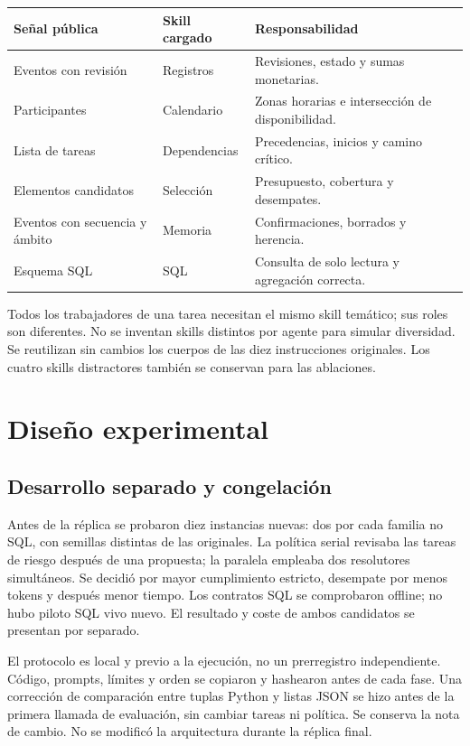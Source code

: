 \documentclass[11pt,a4paper]{article}
\begin{document}
\begin{center}\small
\begin{tabularx}{\linewidth}{@{}p{32mm}p{28mm}X@{}}
\toprule Señal pública & Skill cargado & Responsabilidad \\ \midrule
Eventos con revisión & Registros & Revisiones, estado y sumas monetarias. \\
Participantes & Calendario & Zonas horarias e intersección de disponibilidad. \\
Lista de tareas & Dependencias & Precedencias, inicios y camino crítico. \\
Elementos candidatos & Selección & Presupuesto, cobertura y desempates. \\
Eventos con secuencia y ámbito & Memoria & Confirmaciones, borrados y herencia. \\
Esquema SQL & SQL & Consulta de solo lectura y agregación correcta. \\
\bottomrule
\end{tabularx}\end{center}

Todos los trabajadores de una tarea necesitan el mismo skill temático; sus roles
son diferentes. No se inventan skills distintos por agente para simular diversidad.
Se reutilizan sin cambios los cuerpos de las diez instrucciones originales.
Los cuatro skills distractores también se conservan para las ablaciones.

\section{Diseño experimental}
\subsection{Desarrollo separado y congelación}
Antes de la réplica se probaron diez instancias nuevas: dos por cada familia no
SQL, con semillas distintas de las originales. La política serial revisaba las
tareas de riesgo después de una propuesta; la paralela empleaba dos resolutores
simultáneos. Se decidió por mayor cumplimiento estricto, desempate por menos tokens
y después menor tiempo. Los contratos SQL se comprobaron offline; no hubo piloto
SQL vivo nuevo. El resultado y coste de ambos candidatos se presentan por separado.

El protocolo es local y previo a la ejecución, no un prerregistro independiente.
Código, prompts, límites y orden se copiaron y hashearon antes de cada fase.
Una corrección de comparación entre tuplas Python y listas JSON se hizo antes
de la primera llamada de evaluación, sin cambiar tareas ni política. Se conserva
la nota de cambio. No se modificó la arquitectura durante la réplica final.
\end{document}

